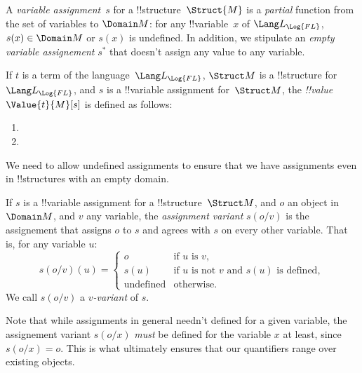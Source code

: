 \documentclass[../../../../include/open-logic-section]{subfiles}
\begin{document}
\begin{defn}
    A \emph{variable assignment}~$s$ for a !!{structure}~$\Struct{M}$ is a
    \emph{partial} function from the set of variables to
    $\Domain M$: for any !!{variable}~$x$ of
    $\Lang L_{\Log{FL}}$, $s(x) \in \Domain M$ or $s(x)$ is undefined. 
    In addition, we stipulate
    an \emph{empty variable assignement} $s^{*}$ that doesn't assign any value to
    any variable.
\end{defn}

\begin{defn}
    If $t$ is a term of the language~$\Lang L_{\Log{FL}}$, $\Struct M$ is a
    !!{structure} for~$\Lang L_{\Log{FL}}$, and $s$ is a !!{variable} assignment
    for~$\Struct M$, the \emph{!!{value}}~$\Value{t}{M}[s]$ is defined as
    follows:
    \begin{enumerate}
    \item {}
    \item {}
    \end{enumerate}
\end{defn}

We need to allow undefined assignments to ensure that we have 
assignments even in !!{structure}s with an empty domain.

\begin{defn}
  If $s$ is a !!{variable} assignment for a !!{structure}~$\Struct M$,
  and $o$ an object in $\Domain M$, and $v$ any variable, the
  \emph{assignment variant} $s(o/v)$ is the assignement that assigns $o$
  to $s$ and agrees with $s$ on every other variable. That is, for any
  variable $u$:
  $$
  s(o/v)(u)=\begin{cases}
    o & \text{if $u$ is $v$},\\
    s(u) & \text{if $u$ is not $v$ and $s(u)$ is defined},\\
    \text{undefined} & \text{otherwise}.  
  \end{cases}
  $$
  We call $s(o/v)$ a \emph{$v$-variant} of $s$.
\end{defn}  

Note that while assignments in general needn't defined for a given
variable, the assignement variant $s(o/x)$ \emph{must} be defined for
the variable $x$ at least, since $s(o/x)=o$. This is what ultimately
ensures that our quantifiers range over existing objects.
        
\end{document}
